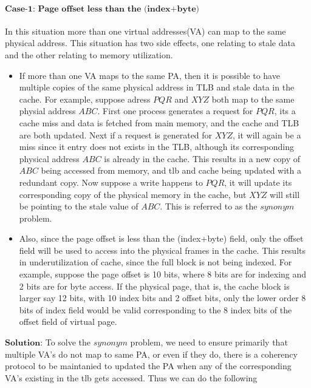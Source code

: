 \documentclass{tufte-handout}
\begin{document}
		\paragraph{$\textbf{Case-1: Page offset less than the (index+byte)}$}
			In this situation more than one virtual addresses(VA) can map to the same physical address. This situation has two side effects, one relating to stale data and the other relating to memory utilization.
			\begin{itemize}
				\item If more than one VA maps to the same PA, then it is possible to have multiple copies of the same physical address in TLB and stale data in the cache. For example, suppose adress $PQR$ and $XYZ$ both map to the same physial address $ABC$. First one process generates a request for $PQR$, its a cache miss and data is fetched from main memory, and the cache and TLB are both updated. Next if a request is generated for $XYZ$, it will again be a miss since it entry does not exists in the TLB, although its corresponding physical address $ABC$ is already in the cache. This results in a new copy of $ABC$ being accessed from memory, and tlb and cache being updated with a redundant copy. Now suppose a write happens to $PQR$, it will update its corresponding copy of the physical memory in the cache, but $XYZ$ will still be pointing to the stale value of $ABC$. This is referred to as the $synonym$ problem.
				\item Also, since the page offset is less than the (index+byte) field, only the offset field will be used to access into the physical frames in the cache. This results in underutilization of cache, since the full block is not being indexed. For example, suppose the page offset is 10 bits, where 8 bits are for indexing and 2 bits are for byte access. If the physical page, that is, the cache block is larger say 12 bits, with 10 index bits and 2 offset bits, only the lower order 8 bits of index field would be valid corresponding to the 8 index bits of the offset field of virtual page.
			\end{itemize}
			$\textbf{Solution:}$ To solve the $synonym$ problem, we need to ensure primarily that multiple VA's do not map to same PA, or even if they do, there is a coherency protocol to be maintanied to updated the PA when any of the corresponding VA's existing in the tlb gets accessed. Thus we can do the following
\end{document}
